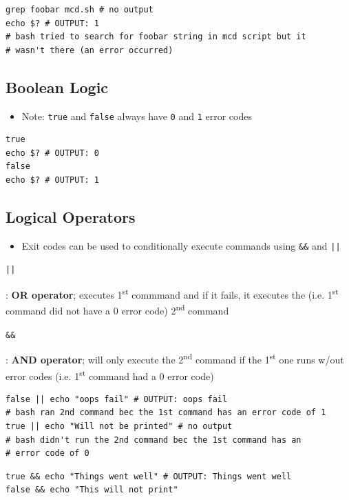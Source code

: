 \documentclass[letterpaper,12pt]{article}
\newcommand*{\lstitem}[1]{
  \setbox0\hbox{\lstinline{#1}}
  \item[\usebox0]
}
\begin{document}
\begin{lstlisting}
grep foobar mcd.sh # no output
echo $? # OUTPUT: 1
# bash tried to search for foobar string in mcd script but it
# wasn't there (an error occurred)
\end{lstlisting}

\subsection{Boolean Logic}

\begin{itemize}
 \item Note: \lstinline{true} and \lstinline{false} always have \lstinline{0} and \lstinline{1} error codes
\end{itemize}

\begin{lstlisting}
true
echo $? # OUTPUT: 0
false
echo $? # OUTPUT: 1
\end{lstlisting}

\subsection{Logical Operators}
\begin{itemize}
 \item Exit codes can be used to conditionally execute commands using \lstinline{&&} and \lstinline{||}
\end{itemize}

\begin{description}
 \lstitem{||}: \textbf{OR operator}; executes 1\textsuperscript{st} commmand and if it fails, it executes the (i.e. 1\textsuperscript{st} command did not have a 0 error code) 2\textsuperscript{nd} command
 \lstitem{&&}: \textbf{AND operator}; will only execute the 2\textsuperscript{nd} command if the 1\textsuperscript{st} one runs w/out error codes (i.e. 1\textsuperscript{st} command had a 0 error code)
\end{description}

\begin{lstlisting}
false || echo "oops fail" # OUTPUT: oops fail
# bash ran 2nd command bec the 1st command has an error code of 1
true || echo "Will not be printed" # no output
# bash didn't run the 2nd command bec the 1st command has an
# error code of 0
\end{lstlisting}

\begin{lstlisting}
true && echo "Things went well" # OUTPUT: Things went well
false && echo "This will not print"
\end{lstlisting}
\end{document}
